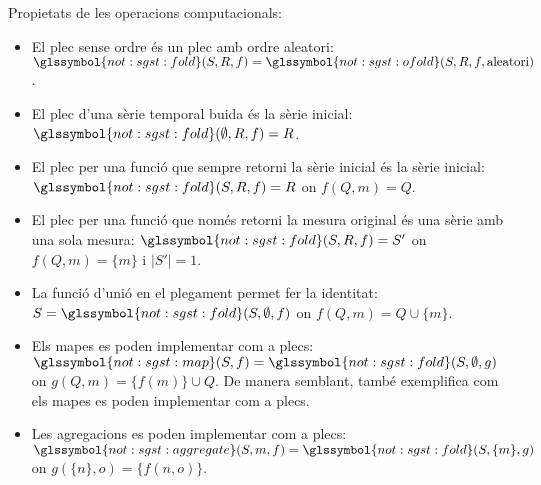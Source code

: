 Propietats de les operacions computacionals:
\begin{itemize}
\item El plec sense ordre és un plec amb ordre aleatori:
  $\glssymbol{not:sgst:fold}(S,R,f)=
  \glssymbol{not:sgst:ofold}(S,R,f,\text{aleatori})$.

\item El plec d'una sèrie temporal buida és la sèrie inicial:
  $\glssymbol{not:sgst:fold}(\emptyset, R, f) = R$.

\item El plec per una funció que sempre retorni la sèrie inicial és la
  sèrie inicial: $\glssymbol{not:sgst:fold}(S, R, f)= R$ on
  $f(Q, m)=Q$.

\item El plec per una funció que només retorni la mesura original és
  una sèrie amb una sola mesura: $\glssymbol{not:sgst:fold}(S, R, f)=
  S'$ on $f(Q,m)=\{m\}$ i $|S'|=1$.


\item La funció d'unió en el plegament permet fer la identitat: $S
  = \glssymbol{not:sgst:fold}(S,\emptyset,f)$
  on $f(Q,m)= Q \cup \{m\}$.


\item Els mapes es poden implementar com a plecs:
  $\glssymbol{not:sgst:map}(S,f) =
  \glssymbol{not:sgst:fold}(S,\emptyset,g)$ on
  $g(Q, m)= \{f(m)\} \cup Q$.  De manera semblant,
  \textcite{lammel08:mapreduce} també exemplifica com els mapes es
  poden implementar com a plecs. %

\item Les agregacions es poden implementar com a plecs:
  $\glssymbol{not:sgst:aggregate}(S,m,f)=
  \glssymbol{not:sgst:fold}(S,\{m\},g)$ on
  $g(\{n\}, o)= \{f(n,o)\}$.

\end{itemize}





